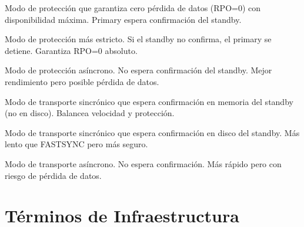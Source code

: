 \documentclass[11pt, a4paper]{report}
\begin{document}
\begin{description}[style=nextline, leftmargin=3cm, font=\normalfont\bfseries]
    \item[MAXAVAILABILITY] Modo de protección que garantiza cero pérdida de datos (RPO=0) con disponibilidad máxima. Primary espera confirmación del standby.

    \item[MAXPROTECTION] Modo de protección más estricto. Si el standby no confirma, el primary se detiene. Garantiza RPO=0 absoluto.

    \item[MAXPERFORMANCE] Modo de protección asíncrono. No espera confirmación del standby. Mejor rendimiento pero posible pérdida de datos.

    \item[FASTSYNC] Modo de transporte sincrónico que espera confirmación en memoria del standby (no en disco). Balancea velocidad y protección.

    \item[SYNC] Modo de transporte sincrónico que espera confirmación en disco del standby. Más lento que FASTSYNC pero más seguro.

    \item[ASYNC] Modo de transporte asíncrono. No espera confirmación. Más rápido pero con riesgo de pérdida de datos.
\end{description}

\section{Términos de Infraestructura}
\end{document}
